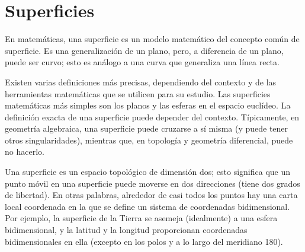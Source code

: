 
\chapter{Superficies}


\begin{defn}[Superficie]
En matemáticas, una superficie es un modelo matemático del concepto común de superficie. Es una generalización de un plano, pero, a diferencia de un plano, puede ser curvo; esto es análogo a una curva que generaliza una línea recta.

Existen varias definiciones más precisas, dependiendo del contexto y de las herramientas matemáticas que se utilicen para su estudio. Las superficies matemáticas más simples son los planos y las esferas en el espacio euclídeo. La definición exacta de una superficie puede depender del contexto. Típicamente, en geometría algebraica, una superficie puede cruzarse a sí misma (y puede tener otros singularidades), mientras que, en topología y geometría diferencial, puede no hacerlo.

Una superficie es un espacio topológico de dimensión dos; esto significa que un punto móvil en una superficie puede moverse en dos direcciones (tiene dos grados de libertad). En otras palabras, alrededor de casi todos los puntos hay una carta local coordenada en la que se define un sistema de coordenadas bidimensional. Por ejemplo, la superficie de la Tierra se asemeja (idealmente) a una esfera bidimensional, y la latitud y la longitud proporcionan coordenadas bidimensionales en ella (excepto en los polos y a lo largo del meridiano 180).
\end{defn}




